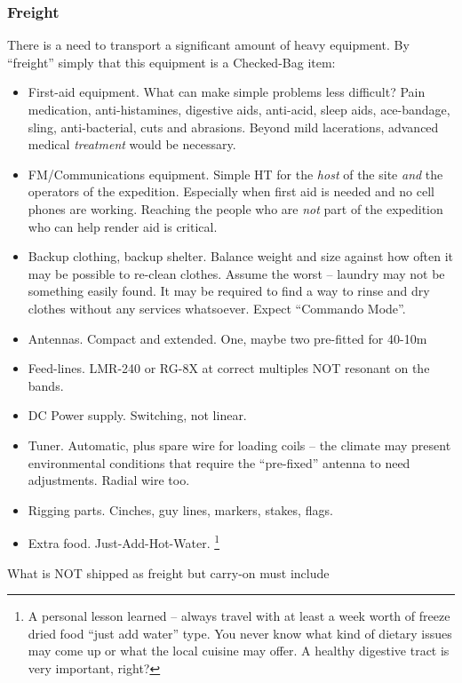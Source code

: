 \documentclass[11pt]{article}
\begin{document}
\subsubsection{Freight}

There is a need to transport a significant amount of heavy
equipment.  By ``freight'' simply that this equipment is 
a Checked-Bag item:

\begin{itemize}
\item First-aid equipment.  What can make simple problems less difficult?
Pain medication, anti-histamines, digestive aids,  anti-acid,
sleep aids, ace-bandage, sling,
anti-bacterial, cuts and abrasions.  Beyond mild lacerations, advanced
medical {\textit{treatment}} would be necessary.
\item FM/Communications equipment.  Simple HT for the {\textit{host}}
of the site {\textit{and}} the operators of the expedition.  Especially
when first aid is needed and no cell phones are working.  Reaching
the people who are {\textit{not}} part of the expedition who can help
render aid is critical.
\item Backup clothing, backup shelter.  Balance weight and size against
how often it may be possible to re-clean clothes.  Assume the worst --
laundry may not be something easily found.  It may be required to 
find a way to rinse and dry clothes without any services whatsoever.  Expect
``Commando Mode''.
\item Antennas. Compact and extended.  One, maybe two pre-fitted for 40-10m
\item Feed-lines. LMR-240 or RG-8X at correct multiples NOT resonant on
the bands.
\item DC Power supply. Switching, not linear.
\item Tuner. Automatic, plus spare wire for loading coils -- the climate
may present environmental conditions that require the ``pre-fixed'' antenna
to need adjustments.  Radial wire too.
\item Rigging parts. Cinches, guy lines, markers, stakes, flags.
\item Extra food. Just-Add-Hot-Water. \footnote{A personal lesson learned -- always travel with
at least a week worth of freeze dried food ``just add water'' type.
You never know what kind of dietary issues may come up or what
the local cuisine may offer.  A healthy digestive tract is very important,
right?}
\end{itemize}

What is NOT shipped as freight but carry-on must include
\end{document}
